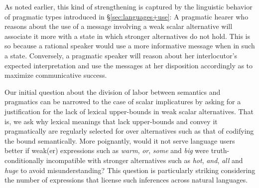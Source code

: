 \documentclass[a4paper, 11pt]{article}
\begin{document}
As noted earlier, this kind of strengthening is captured by the linguistic behavior of pragmatic types introduced in \S\ref{sec:languages+use}: A pragmatic hearer who reasons about the use of a message involving a weak scalar alternative will associate it more with a state in which stronger alternatives do not hold. This is so because a rational speaker would use a more informative message when in such a state. Conversely, a pragmatic speaker will reason about her interlocutor's expected interpretation and use the messages at her disposition accordingly as to maximize communicative success.

Our initial question about the division of labor between semantics and pragmatics can be narrowed to the case of scalar implicatures by asking for a justification for the lack of lexical upper-bounds in weak scalar alternatives. That is, we ask why lexical meanings that lack upper-bounds and convey it pragmatically are regularly selected for over alternatives such as that of codifying the bound semantically. More poignantly, would it not serve language users better if weak(er) expressions such as {\em warm}, {\em or}, {\em some} and {\em big} were truth-conditionally incompatible with stronger alternatives such as {\em hot}, {\em and}, {\em all} and {\em huge} to avoid misunderstanding?  This question is particularly striking considering the number of expressions that license such inferences across natural languages. 
\end{document}
